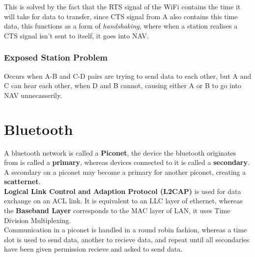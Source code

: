 \documentclass[11pt,a4paper,twoside]{book}
\begin{document}
This is solved by the fact that the RTS signal of the WiFi contains the time it will take for data to transfer, since CTS signal from A also contains this time data, this functions as a form of \textit{handshaking}, where when a station realises a CTS signal isn't sent to itself, it goes into NAV.\\

\subsubsection{Exposed Station Problem}

Occurs when A-B and C-D pairs are trying to send data to each other, but A and C can hear each other, when D and B cannot, causing either A or B to go into NAV unnecasserily.

\section{Bluetooth}

A bluetooth network is called a \textbf{Piconet}, the device the bluetooth originates from is called a \textbf{primary}, whereas devices connected to it is called a \textbf{secondary}. A secondary on a piconet may become a primary for another piconet, creating a \textbf{scatternet}.\\

\textbf{Logical Link Control and Adaption Protocol (L2CAP)} is used for data exchange on an ACL link. It is equivalent to an LLC layer of ethernet, whereas the \textbf{Baseband Layer} corresponds to the MAC layer of LAN, it uses Time Division Multiplexing.\\

Communication in a piconet is handled in a round robin fashion, whereas a time slot is used to send data, another to recieve data, and repeat until all secondaries have been given permission recieve and asked to send data.
\end{document}

